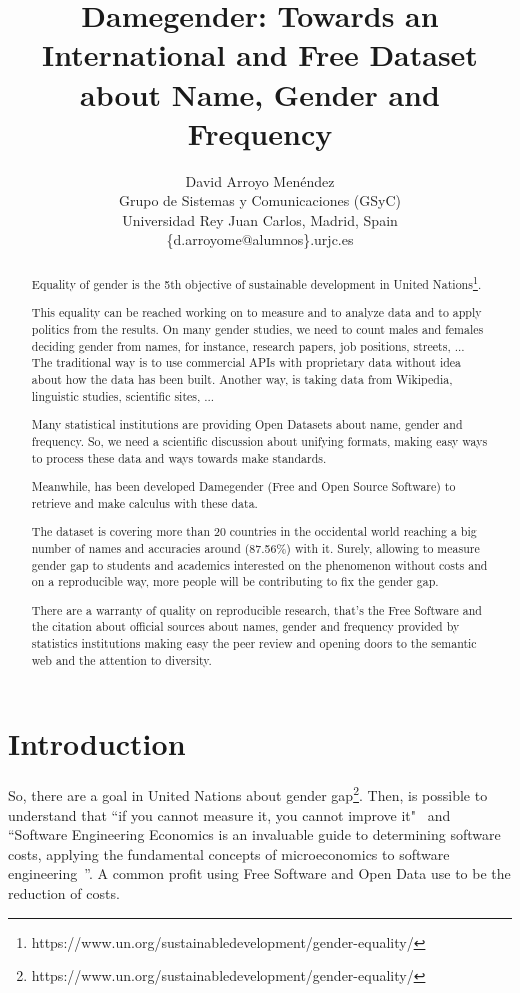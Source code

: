 \documentclass[a4paper]{article}
\title{Damegender: Towards an International and Free Dataset about Name, Gender and Frequency}
\author{
David Arroyo Menéndez \\ Grupo de Sistemas y Comunicaciones (GSyC) \\ Universidad Rey Juan Carlos, Madrid, Spain \\ \{d.arroyome@alumnos\}.urjc.es
}
\begin{document}
\maketitle

\begin{abstract}

  Equality of gender is the 5th objective of sustainable development
  in United
  Nations\footnote{https://www.un.org/sustainabledevelopment/gender-equality/}.

  This equality can be reached working on to measure and to analyze
  data and to apply politics from the results. On many gender studies,
  we need to count males and females deciding gender from names, for
  instance, research papers, job positions, streets, ... The
  traditional way is to use commercial APIs with proprietary data
  without idea about how the data has been built. Another way, is
  taking data from Wikipedia, linguistic studies, scientific sites, ...


  Many statistical institutions are providing Open Datasets about
  name, gender and frequency. So, we need a scientific discussion
  about unifying formats, making easy ways to process these data and
  ways towards make standards.

  Meanwhile, has been developed Damegender (Free and Open Source
  Software) to retrieve and make calculus with these data.


  The dataset is covering more than 20 countries in the occidental
  world reaching a big number of names and accuracies around (87.56\%)
  with it. Surely, allowing to measure gender gap to students and
  academics interested on the phenomenon without costs and on a
  reproducible way, more people will be contributing to fix the gender
  gap.


  There are a warranty of quality on reproducible research, that's the
  Free Software and the citation about official sources about names,
  gender and frequency provided by statistics institutions making easy
  the peer review and opening doors to the semantic web and the
  attention to diversity.
  
\end{abstract}

\section{Introduction}
So, there are a goal in United Nations about gender
gap\footnote{https://www.un.org/sustainabledevelopment/gender-equality/}. Then,
is possible to understand that ``if you cannot measure it, you cannot
improve it"~\cite{thompson1833electrical} and ``Software Engineering
Economics is an invaluable guide to determining software costs,
applying the fundamental concepts of microeconomics to software
engineering~\cite{barry1981software}''. A common profit using Free
Software and Open Data use to be the reduction of costs.
\end{document}
